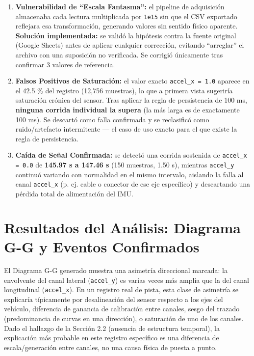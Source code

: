 \documentclass[12pt, letterpaper]{article}
\begin{document}
	\begin{enumerate}
		\item \textbf{Vulnerabilidad de ``Escala Fantasma'':} el pipeline de adquisición almacenaba cada lectura multiplicada por \texttt{1e15} sin que el CSV exportado reflejara esa transformación, generando valores sin sentido físico aparente.\\
		\textbf{Solución implementada:} se validó la hipótesis contra la fuente original (Google Sheets) antes de aplicar cualquier corrección, evitando ``arreglar'' el archivo con una suposición no verificada. Se corrigió únicamente tras confirmar 3 valores de referencia.
		
		\item \textbf{Falsos Positivos de Saturación:} el valor exacto \texttt{accel\_x = 1.0} aparece en el 42.5 \% del registro (12,756 muestras), lo que a primera vista sugeriría saturación crónica del sensor. Tras aplicar la regla de persistencia de 100 ms, \textbf{ninguna corrida individual la supera} (la más larga es de exactamente 100 ms). Se descartó como falla confirmada y se reclasificó como ruido/artefacto intermitente — el caso de uso exacto para el que existe la regla de persistencia.
		
		\item \textbf{Caída de Señal Confirmada:} se detectó una corrida sostenida de \texttt{accel\_x = 0.0} de \textbf{145.97 s a 147.46 s} (150 muestras, 1.50 s), mientras \texttt{accel\_y} continuó variando con normalidad en el mismo intervalo, aislando la falla al canal \texttt{accel\_x} (p. ej. cable o conector de ese eje específico) y descartando una pérdida total de alimentación del IMU.
	\end{enumerate}
	
	\section{Resultados del Análisis: Diagrama G-G y Eventos Confirmados}
	El Diagrama G-G generado muestra una asimetría direccional marcada: la envolvente del canal lateral (\texttt{accel\_y}) es varias veces más amplia que la del canal longitudinal (\texttt{accel\_x}). En un registro real de pista, esta clase de asimetría se explicaría típicamente por desalineación del sensor respecto a los ejes del vehículo, diferencia de ganancia de calibración entre canales, sesgo del trazado (predominancia de curvas en una dirección), o saturación de uno de los canales. Dado el hallazgo de la Sección 2.2 (ausencia de estructura temporal), la explicación más probable en este registro específico es una diferencia de escala/generación entre canales, no una causa física de puesta a punto.
	
\end{document}
